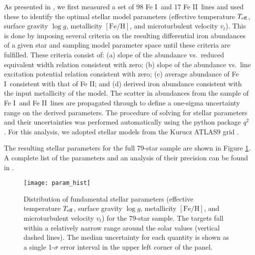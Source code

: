 \documentclass[twocolumn]{aastex62}
\newcommand{\teff}{$T_{\rm eff}$}
\newcommand{\logg}{$\log g$}
\newcommand{\feh}{$\mathrm{[Fe/H]}$}
\newcommand{\vt}{$v_t$}
\newcommand{\I}{\textsc{I}}
\newcommand{\II}{\textsc{II}}
\newcommand{\acronym}[1]{{\small{#1}}}
\begin{document}
As presented in \citet{spina17}, we first measured a set of 98 Fe \I\ and 17 Fe \II\ lines and used these to identify the optimal stellar model parameters (effective temperature \teff, surface gravity \logg, metallicity \feh, and microturbulent velocity \vt). This is done by imposing several criteria on the resulting differential iron abundances of a given star and sampling model parameter space until these criteria are fulfilled. These criteria consist of: (a) slope of the abundance vs.\ reduced equivalent width relation consistent with zero; (b) slope of the abundance vs.\ line excitation potential relation consistent with zero; (c) average abundance of Fe \I\ consistent with that of Fe \II; and (d) derived iron abundance consistent with the input metallicity of the model. The scatter in abundances from the sample of Fe \I\ and Fe \II\ lines are propagated through to define a one-sigma uncertainty range on the derived parameters. The procedure of solving for stellar parameters and their uncertainties was performed automatically using the python package \texttt{$q^2$} \citep{ramirez14}. For this analysis, we adopted stellar models from the Kurucz \acronym{ATLAS9} grid \citep{castelli04}. 

The resulting stellar parameters for the full 79-star sample are shown in Figure \ref{fig:params}. A complete list of the parameters and an analysis of their precision can be found in \citet{spina17}.

\begin{figure}
\centering
\texttt{[image: param\_hist]}
\caption{Distribution of fundamental stellar parameters (effective temperature \teff, surface gravity \logg, metallicity \feh, and microturbulent velocity \vt) for the 79-star sample. The targets fall within a relatively narrow range around the solar values (vertical dashed lines). The median uncertainty for each quantity is shown as a single 1-$\sigma$ error interval in the upper left corner of the panel.}
\label{fig:params}
\end{figure}
\end{document}

